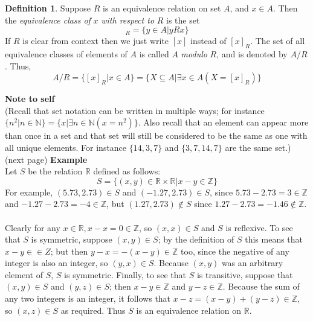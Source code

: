 \documentclass{report}
\theoremstyle{definition}
\newtheorem*{definition}{Definition}
\begin{document}
\begin{definition}
Suppose $R$ is an equivalence relation on set $A$, and $x\in A$. Then the \textit{equivalence class of} $x$ \textit{with respect to} $R$ is the set
\begin{equation*}
[x]_R=\{y\in A|yRx\}
\end{equation*}
If $R$ is clear from context then we just write $[x]$ instead of $[x]_R$. The set of all equivalence classes of elements of 
$A$ is called $A$ \textit{modulo} $R$, and is denoted by $A/R$. Thus,
\begin{equation*}
A/R=\{[x]_R|x\in A\}=\{X\subseteq A|\exists x\in A(X=[x]_R)\}
\end{equation*}
\end{definition}
\noindent\textbf{Note to self}\\
(Recall that set notation can be written in multiple ways; for instance $\{n^2|n\in\mathbb N\}=\{x|\exists n\in\mathbb N(x=n^2)\}$. Also recall that 
an element can appear more than once in a set and that set will still be considered to be the same as one with all unique elements. For instance
$\{14,3,7\}$ and $\{3,7,14,7\}$ are the same set.)\\
(next page)\newpage
\noindent\textbf{Example}\\
Let $S$ be the relation $\mathbb R$ defined as follows:
\begin{equation*}
S=\{(x,y)\in\mathbb R\times\mathbb R|x-y\in\mathbb Z\}
\end{equation*}
For example, $(5.73,2.73)\in S$ and $(-1.27,2.73)\in S$, since $5.73-2.73=3\in\mathbb Z$ and 
$-1.27-2.73=-4\in\mathbb Z$, but $(1.27,2.73)\notin S$ since $1.27-2.73=-1.46\notin\mathbb Z$.\\
\vspace{1mm}\\
Clearly for any $x\in\mathbb R, x-x=0\in\mathbb Z$, so $(x,x)\in S$ and $S$ is reflexive. To see that $S$ is symmetric, suppose $(x,y)\in S$; by the definition of $S$ this means that 
$x-y\in\mathbb\in Z$; but then $y-x=-(x-y)\in\mathbb Z$ too, since the negative of any integer is also an integer, so $(y,x)\in S$. Because $(x,y)$ was an arbitrary element of $S$, 
$S$ is symmetric. Finally, to see that $S$ is transitive, suppose that $(x,y)\in S$ and $(y,z)\in S$; then $x-y\in\mathbb Z$ and $y-z\in\mathbb Z$. Because the sum of any two integers is an integer,
it follows that $x-z=(x-y)+(y-z)\in\mathbb Z$, so $(x,z)\in S$ as required. Thus $S$ is an equivalence relation on $\mathbb R$.\\
\end{document}
